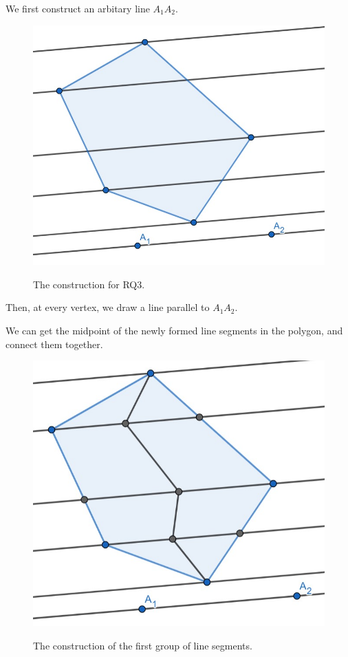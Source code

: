 \documentclass[12pt]{scrartcl}
\begin{document}
We first construct an arbitary line $A_{1}A_{2}$.

\begin{figure}[htpb]
	\centering
	\includegraphics[scale=.75]{images/rq3_1_1.jpg}
	\label{fig:rq3_1_1_img}
	\caption{The construction for RQ3.}
\end{figure}

Then, at every vertex, we draw a line parallel to $A_{1}A_{2}$.
\pagebreak

We can get the midpoint of the newly formed line segments in the polygon, and connect them together.

\begin{figure}[htpb]
	\centering
	\includegraphics[scale=.75]{images/rq3_1_2.jpg}
	\label{fig:rq3_1_2_img}
	\caption{The construction of the first group of line segments.}
\end{figure}
\end{document}
